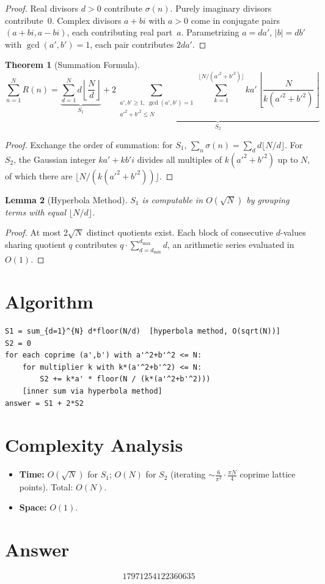 \documentclass[12pt]{article}
\newtheorem{theorem}{Theorem}
\newtheorem{lemma}[theorem]{Lemma}
\begin{document}
\begin{proof}
Real divisors $d > 0$ contribute $\sigma(n)$. Purely imaginary divisors contribute~$0$. Complex divisors $a+bi$ with $a>0$ come in conjugate pairs $(a+bi, a-bi)$, each contributing real part~$a$. Parametrizing $a = da'$, $|b| = db'$ with $\gcd(a',b')=1$, each pair contributes $2da'$.
\end{proof}

\begin{theorem}[Summation Formula]
\label{thm:sum}
\[
\sum_{n=1}^{N} R(n) = \underbrace{\sum_{d=1}^{N} d\!\left\lfloor \frac{N}{d} \right\rfloor}_{S_1} + 2\!\!\underbrace{\sum_{\substack{a',b' \ge 1,\;\gcd(a',b')=1 \\ a'^2+b'^2 \le N}} \sum_{k=1}^{\lfloor N/(a'^2+b'^2) \rfloor} ka' \!\left\lfloor \frac{N}{k(a'^2+b'^2)} \right\rfloor}_{S_2}
\]
\end{theorem}

\begin{proof}
Exchange the order of summation: for $S_1$, $\sum_n \sigma(n) = \sum_d d\lfloor N/d\rfloor$. For $S_2$, the Gaussian integer $ka'+kb'i$ divides all multiples of $k(a'^2+b'^2)$ up to $N$, of which there are $\lfloor N/(k(a'^2+b'^2))\rfloor$.
\end{proof}

\begin{lemma}[Hyperbola Method]
$S_1$ is computable in $O(\sqrt{N})$ by grouping terms with equal $\lfloor N/d \rfloor$.
\end{lemma}

\begin{proof}
At most $2\sqrt{N}$ distinct quotients exist. Each block of consecutive $d$-values sharing quotient $q$ contributes $q \cdot \sum_{d=d_{\min}}^{d_{\max}} d$, an arithmetic series evaluated in $O(1)$.
\end{proof}

\section{Algorithm}

\begin{verbatim}
S1 = sum_{d=1}^{N} d*floor(N/d)  [hyperbola method, O(sqrt(N))]
S2 = 0
for each coprime (a',b') with a'^2+b'^2 <= N:
    for multiplier k with k*(a'^2+b'^2) <= N:
        S2 += k*a' * floor(N / (k*(a'^2+b'^2)))
    [inner sum via hyperbola method]
answer = S1 + 2*S2
\end{verbatim}

\section{Complexity Analysis}

\begin{itemize}
    \item \textbf{Time:} $O(\sqrt{N})$ for $S_1$; $O(N)$ for $S_2$ (iterating $\sim\!\frac{6}{\pi^2}\cdot\frac{\pi N}{4}$ coprime lattice points). Total: $O(N)$.
    \item \textbf{Space:} $O(1)$.
\end{itemize}

\section{Answer}

\[
\boxed{17971254122360635}
\]
\end{document}
